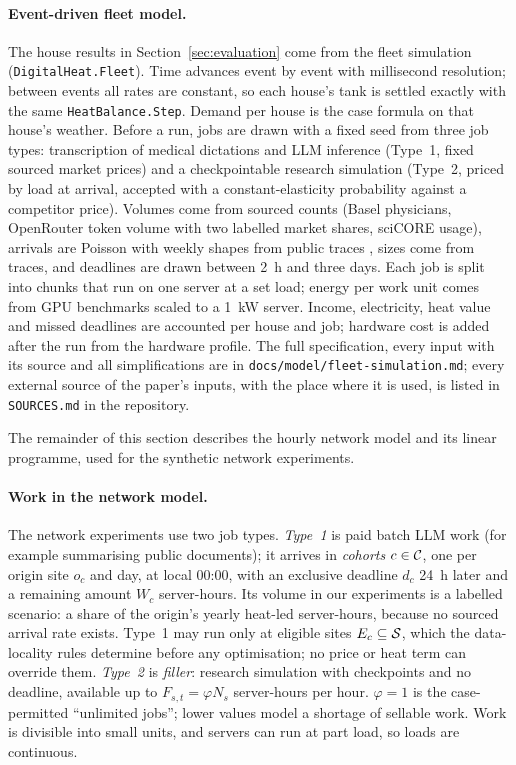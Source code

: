\paragraph{Event-driven fleet model.} The house results in Section~\ref{sec:evaluation} come
from the fleet simulation (\texttt{DigitalHeat.Fleet}). Time advances event by event with
millisecond resolution; between events all rates are constant, so each house's tank is settled
exactly with the same \texttt{HeatBalance.Step}. Demand per house is the case formula on that
house's weather. Before a run, jobs are drawn with a fixed seed from three job types: transcription
of medical dictations and LLM inference (Type~1, fixed sourced market prices) and a checkpointable
research simulation (Type~2, priced by load at arrival, accepted with a constant-elasticity
probability against a competitor price). Volumes come from sourced counts (Basel physicians,
OpenRouter token volume with two labelled market shares, sciCORE usage), arrivals are Poisson with
weekly shapes from public traces \cite{azure_llm_trace,alibaba_trace}, sizes come from traces, and deadlines are drawn between
\qty{2}{h} and three days. Each job is split into chunks that run on one server at a set load;
energy per work unit comes from GPU benchmarks scaled to a \qty{1}{kW} server. Income,
electricity, heat value and missed deadlines are accounted per house and job; hardware cost is
added after the run from the hardware profile. The full specification, every input with its source
and all simplifications are in \texttt{docs/model/fleet-simulation.md}; every external source of
the paper's inputs, with the place where it is used, is listed in \texttt{SOURCES.md} in the
repository.

The remainder of this section describes the hourly network model and its linear programme, used
for the synthetic network experiments.

\paragraph{Work in the network model.} The network experiments use two job types. \emph{Type~1} is paid batch LLM work
(for example summarising public documents); it arrives in \emph{cohorts} $c \in \mathcal{C}$, one per
origin site $o_c$ and day, at local 00:00, with an exclusive deadline $d_c$ \qty{24}{h} later and a
remaining amount $W_c$ server-hours. Its volume in our experiments is a labelled scenario: a share
of the origin's yearly heat-led server-hours, because no sourced arrival rate exists. Type~1 may
run only at eligible sites $E_c \subseteq \mathcal{S}$, which the data-locality rules
determine before any optimisation; no price or heat term can override them. \emph{Type~2} is
\emph{filler}: research simulation with checkpoints and no deadline, available up to
$F_{s,t} = \varphi N_s$ server-hours per hour. $\varphi = 1$ is the case-permitted ``unlimited
jobs''; lower values model a shortage of sellable work. Work is divisible into small units, and
servers can run at part load, so loads are continuous.

